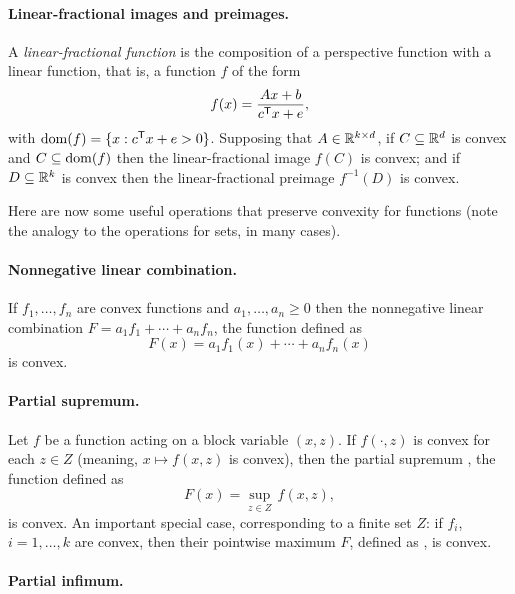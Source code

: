 \paragraph{Linear-fractional images and preimages.} 

A \emph{linear-fractional function} is the composition of a perspective function
with a linear function, that is, a function $f$ of the form      
\[
f(x) = \frac{Ax + b}{c^{\mathsf{T}} x + e},
\]
with $\operatorname{dom}(f) = \{x : c^{\mathsf{T}} x + e > 0\}$. Supposing that $A \in \mathbb{R}^{k
  \times d}$, if $C \subseteq \mathbb{R}^d$ is convex and $C \subseteq \operatorname{dom}(f)$ then 
the linear-fractional image $f(C)$ is convex; and if $D \subseteq \mathbb{R}^k$ is 
convex then the linear-fractional preimage $f^{-1}(D)$ is convex.

\medskip

Here are now some useful operations that preserve convexity for functions (note
the analogy to the operations for sets, in many cases). 

\paragraph{Nonnegative linear combination.} 

If $f_1,\ldots,f_n$ are convex functions and $a_1,\ldots,a_n \geq 0$ then the
nonnegative linear combination $F = a_1f_1+\cdots+a_nf_n$, the function defined
as
\[
F(x) = a_1f_1(x) + \cdots + a_nf_n(x) 
\]
is convex.

\paragraph{Partial supremum.} 

Let $f$ be a function acting on a block variable $(x,z)$. If $f(\cdot,z)$ is
convex for each $z \in Z$ (meaning, $x \mapsto f(x,z)$ is convex), then the
partial supremum , the function defined
as  
\[
F(x) = \sup_{z \in Z} \, f(x,z),
\]
is convex. An important special case, corresponding to a finite set $Z$: if
$f_i$, $i=1,\ldots,k$ are convex, then their pointwise maximum $F$, defined as
, is convex.      

\paragraph{Partial infimum.} 

